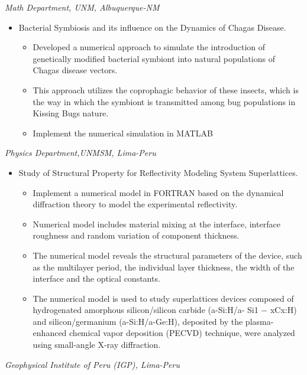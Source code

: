 \documentclass[margin]{res}
\begin{document}
\begin{resume}
\begin{itemize}
\end{itemize} 
%
{\sl Math Department, UNM, Albuquerque-NM}%
\begin{itemize}  \itemsep -2pt %
\item Bacterial Symbiosis and its influence on the Dynamics of Chagas Disease.
\begin{itemize}
\item Developed a numerical approach to simulate the introduction of genetically modified bacterial symbiont into natural populations of Chagas disease vectors.
\item This approach utilizes the coprophagic behavior of these insects, which is the way in which the symbiont is transmitted among
bug populations in Kissing Bugs nature.
\item Implement the numerical simulation in MATLAB
\end{itemize}
\end{itemize}
%
{\sl Physics Department,UNMSM, Lima-Peru} %
\begin{itemize}\itemsep -2pt
\item Study of Structural Property for Reflectivity Modeling System Superlattices.
\begin{itemize}
\item Implement a numerical model in FORTRAN  based on the dynamical diffraction theory to model the experimental reflectivity.
\item Numerical model includes material mixing at the interface, interface roughness and random variation of component thickness.
\item The numerical model reveals the structural parameters of the device, such as the multilayer period, the individual layer thickness, the width of the interface and the optical constants. 
\item The numerical model is used to study superlattices devices composed of hydrogenated amorphous silicon/silicon carbide (a-Si:H/a- Si1 − xCx:H) and silicon/germanium (a-Si:H/a-Ge:H), deposited by the plasma-enhanced chemical vapor deposition (PECVD) technique, were
analyzed using small-angle X-ray diffraction.
\end{itemize}
\end{itemize} 
%
{\sl Geophysical Institute of Peru (IGP), Lima-Peru}%
\begin{itemize}\itemsep -2pt

\end{itemize}
\end{resume}
\end{document}
